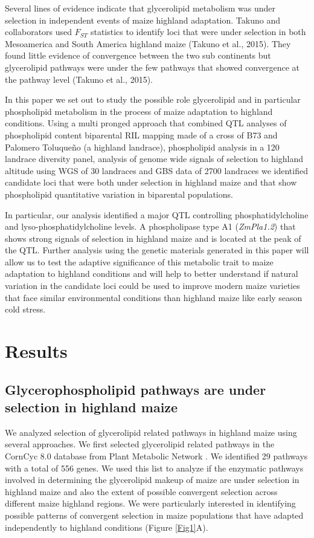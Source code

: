 \documentclass[9pt,twocolumn,twoside,lineno]{gsajnl}
\begin{document}
Several lines of evidence indicate that glycerolipid metabolism was under selection in independent events of maize highland adaptation. 
Takuno and collaborators used $F_{ST}$ statistics to identify loci that were under selection in both Mesoamerica and South America highland maize (Takuno et al., 2015). 
They found little evidence of convergence between the two sub continents but glycerolipid pathways were under the few pathways that showed convergence at the pathway level (Takuno et al., 2015). 

In this paper we set out to study the possible role glycerolipid and in particular phospholipid metabolism in the process of maize adaptation to highland conditions. 
Using a multi pronged approach that combined QTL analyses of phospholipid content biparental RIL mapping made of a cross of B73 and Palomero Toluqueño (a highland landrace), phospholipid analysis in a 120 landrace diversity panel, analysis of genome wide signals of selection to highland altitude using WGS of 30 landraces and GBS data of 2700 landraces we identified candidate loci  that were both under selection in highland maize and that show phospholipid quantitative variation  in biparental populations. 

In particular, our analysis identified a major QTL controlling phosphatidylcholine and lyso-phosphatidylcholine levels. A phospholipase type A1 (\textit{ZmPla1.2}) that shows strong signals of selection in highland maize and is located at the peak of the QTL. Further analysis using the genetic materials generated in this paper will allow us to test the adaptive significance of this metabolic trait to maize adaptation to highland conditions and will help to better understand if natural variation in the candidate loci could be used to improve modern maize varieties that face similar environmental conditions than highland maize like early season cold stress. 
\section{Results}
\label{sec:results}

\subsection{Glycerophospholipid pathways are under selection in  highland maize} 
We analyzed selection of glycerolipid related pathways in highland maize using several approaches. 
We first selected glycerolipid related pathways in the CornCyc 8.0 database from  Plant Metabolic Network \cite{Schlapfer2017-yl}. We identified 29 pathways with a total of 556 genes. 
We used this list to analyze if the enzymatic pathways involved in determining the glycerolipid makeup of maize are under selection in highland maize and also the extent of possible convergent selection across different maize highland regions. 
We were particularly interested in identifying possible patterns of convergent selection in maize populations that have adapted independently to highland conditions (Figure \ref{Fig1}A).  
\end{document}
